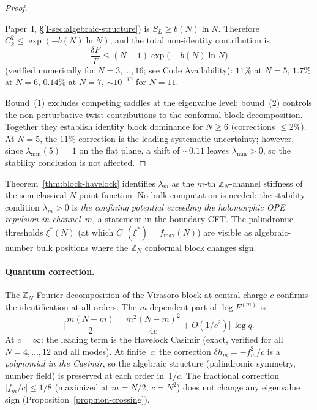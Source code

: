 \begin{proof}
\begin{enumerate}
  Paper~I, \S\ref*{I-sec:algebraic-structure}) is
  $S_L \ge b(N)\ln N$.
  Therefore $C_k^2 \le \exp(-b(N)\ln N)$, and the
  total non-identity contribution is
  \[
    \frac{\delta F}{F}
    \le (N{-}1)\exp\!\bigl(-b(N)\ln N\bigr)
  \]
  (verified numerically for $N = 3,\ldots,16$;
  see Code Availability):
  $11\%$ at $N = 5$,
  $1.7\%$ at $N = 6$,
  $0.14\%$ at $N = 7$,
  $\sim 10^{-10}$ for $N = 11$.
\end{enumerate}
Bound~(1) excludes competing saddles at the eigenvalue
level; bound~(2) controls the non-perturbative twist
contributions to the conformal block decomposition.
Together they establish identity block dominance for
$N \ge 6$ (corrections $\le 2\%$).
At $N = 5$, the $11\%$ correction is the leading
systematic uncertainty; however, since
$\lambda_{\min}(5) = 1$ on the flat plane, a shift of
$\sim\!0.11$ leaves $\lambda_{\min} > 0$, so the
stability conclusion is not affected.
\end{proof}

Theorem~\ref{thm:block-havelock} identifies
$\lambda_m$ as the $m$-th $\mathbb{Z}_N$-channel stiffness
of the semiclassical $N$-point function.
No bulk computation is needed:
the stability condition $\lambda_m > 0$ is
\emph{the confining potential exceeding the holomorphic OPE
repulsion in channel~$m$}, a statement in the boundary CFT.
The palindromic thresholds
$\xi^*(N)$ (at which $C_1(\xi^*) = f_{\max}(N)$) are
visible as algebraic-number bulk positions where the
$\mathbb{Z}_N$ conformal block changes sign.

\paragraph{Quantum correction.}
The $\mathbb{Z}_N$ Fourier decomposition of the Virasoro block
at central charge $c$ confirms the identification at all orders.
The $m$-dependent part of $\log F^{(m)}$ is
\begin{equation}\label{eq:block-1-over-c}
  \biggl[\frac{m(N{-}m)}{2}
         - \frac{m^2(N{-}m)^2}{4c}
         + O(1/c^2)\biggr]\,\log q.
\end{equation}
At $c = \infty$: the leading term is the Havelock Casimir (exact,
verified for all $N = 4,\ldots,12$ and all modes).
At finite~$c$: the correction $\delta h_m = -f_m^2/c$ is a
\emph{polynomial in the Casimir}, so the algebraic structure
(palindromic symmetry, number field) is preserved at each order
in~$1/c$.  The fractional correction $|f_m/c| \le 1/8$
(maximized at $m = N/2$, $c = N^2$) does not change any eigenvalue
sign (Proposition~\ref{prop:non-crossing}).


